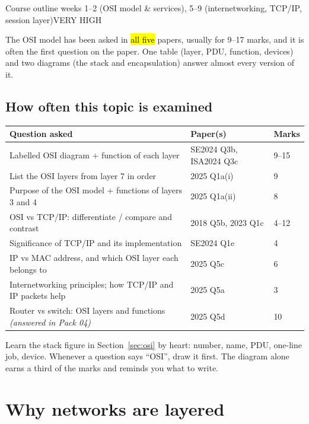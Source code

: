 \documentclass[10pt]{article}
\begin{document}
  {Course outline weeks 1--2 (OSI model \& services), 5--9 (internetworking, TCP/IP, session layer)}{VERY HIGH}

The OSI model has been asked in \hl{all five} papers, usually for 9--17 marks, and it is often the first question on the paper.
One table (layer, PDU, function, devices) and two diagrams (the stack and encapsulation) answer almost every version of it.

\subsection*{How often this topic is examined}
\begin{tabularx}{\linewidth}{@{}Xll@{}}
\toprule
\textbf{Question asked} & \textbf{Paper(s)} & \textbf{Marks}\\
\midrule
Labelled OSI diagram + function of each layer & SE2024 Q3b, ISA2024 Q3c & 9--15\\
List the OSI layers from layer 7 in order & 2025 Q1a(i) & 9\\
Purpose of the OSI model + functions of layers 3 and 4 & 2025 Q1a(ii) & 8\\
OSI vs TCP/IP: differentiate / compare and contrast & 2018 Q5b, 2023 Q1c & 4--12\\
Significance of TCP/IP and its implementation & SE2024 Q1e & 4\\
IP vs MAC address, and which OSI layer each belongs to & 2025 Q5c & 6\\
Internetworking principles; how TCP/IP and IP packets help & 2025 Q5a & 3\\
Router vs switch: OSI layers and functions \textit{(answered in Pack 04)} & 2025 Q5d & 10\\
\bottomrule
\end{tabularx}

\begin{examtip}
Learn the stack figure in Section~\ref{sec:osi} by heart: number, name, PDU, one-line job, device.
Whenever a question says ``OSI'', draw it first. The diagram alone earns a third of the marks and reminds you what to write.
\end{examtip}

\section{Why networks are layered}
\end{document}
